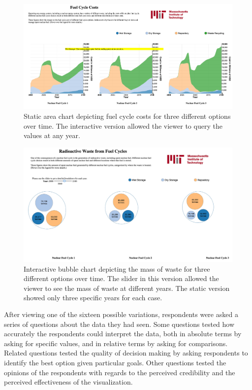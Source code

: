 \begin{figure}[htbp]
  \centering
  \includegraphics[width=\columnwidth]{./images/viz-area-static-cost}
  \caption[Static area chart for visualization experiments.]{Static area chart depicting fuel cycle costs for three different
    options over time.  The interactive version allowed the viewer to query the
    values at any year.}
  \label{fig:viz-area-static-cost}
\end{figure}

\begin{figure}[htbp]
  \centering
  \includegraphics[width=\columnwidth]{./images/viz-bubble-dynamic-waste}
  \caption[Interactive bubble chart for visualization
    experiments.]{Interactive bubble chart depicting the mass of waste for
    three different options over time.  The slider in this version allowed the
    viewer to see the mass of waste at different years.  The static version
    showed only three specific years for each case.}
  \label{fig:viz-bubble-dynamic-waste}
\end{figure}

After viewing one of the sixteen possible variations, respondents were asked a
series of questions about the data they had seen.  Some questions tested how
accurately the respondents could interpret the data, both in absolute terms by
asking for specific values, and in relative terms by asking for comparisons.
Related questions tested the quality of decision making by asking respondents
to identify the best option given particular goals.  Other questions tested
the opinions of the respondents with regards to the perceived credibility and
the perceived effectiveness of the visualization.

